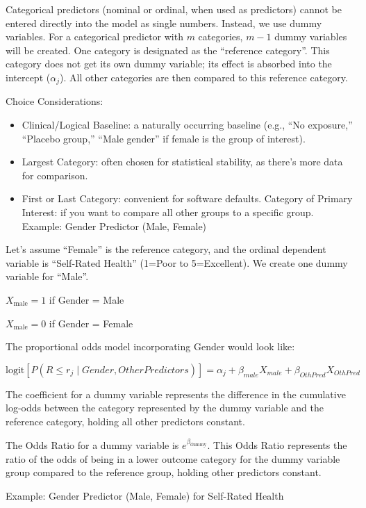 \documentclass[
  letterpaper,
  DIV=11,
  numbers=noendperiod]{scrartcl}
\begin{document}
Categorical predictors (nominal or ordinal, when used as predictors)
cannot be entered directly into the model as single numbers. Instead, we
use dummy variables. For a categorical predictor with \(m\) categories,
\(m−1\) dummy variables will be created. One category is designated as
the ``reference category''. This category does not get its own dummy
variable; its effect is absorbed into the intercept (\(\alpha_j\)). All
other categories are then compared to this reference category.

Choice Considerations:

\begin{itemize}
\item
  Clinical/Logical Baseline: a naturally occurring baseline (e.g., ``No
  exposure,'' ``Placebo group,'' ``Male gender'' if female is the group
  of interest).
\item
  Largest Category: often chosen for statistical stability, as there's
  more data for comparison.
\item
  First or Last Category: convenient for software defaults. Category of
  Primary Interest: if you want to compare all other groups to a
  specific group. Example: Gender Predictor (Male, Female)
\end{itemize}

Let's assume ``Female'' is the reference category, and the ordinal
dependent variable is ``Self-Rated Health'' (1=Poor to 5=Excellent). We
create one dummy variable for ``Male''.

\(X_{\text{male}}=1\) if Gender = Male

\(X_{\text{male}}=0\) if Gender = Female

The proportional odds model incorporating Gender would look like:

\[\text{logit}[P(R\leq r_j∣Gender,Other Predictors)] = \alpha_j + \beta_{male}X_{male} + \beta_{OthPred}X_{OthPred} \]

The coefficient for a dummy variable represents the difference in the
cumulative log-odds between the category represented by the dummy
variable and the reference category, holding all other predictors
constant.

The Odds Ratio for a dummy variable is \(e^{\beta_{\text{dummy}}}\).
This Odds Ratio represents the ratio of the odds of being in a lower
outcome category for the dummy variable group compared to the reference
group, holding other predictors constant.

Example: Gender Predictor (Male, Female) for Self-Rated Health
\end{document}
